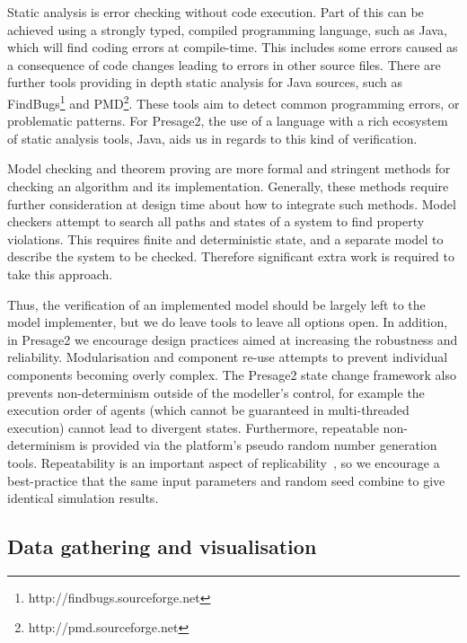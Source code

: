 Static analysis is error checking without code execution. Part of this can be
achieved using a strongly typed, compiled programming language, such as Java,
which will find coding errors at compile-time. This includes some errors
caused as a consequence of code changes leading to errors in other source
files. There are further tools providing in depth static analysis for Java
sources, such as FindBugs\footnote{http://findbugs.sourceforge.net} and
PMD\footnote{http://pmd.sourceforge.net}. These tools aim to detect common
programming errors, or problematic patterns. For Presage2, the use of a
language with a rich ecosystem of static analysis tools, Java, aids us in
regards to this kind of verification.

Model checking and theorem proving are more formal and stringent methods for
checking an algorithm and its implementation. Generally, these methods require
further consideration at design time about how to integrate such methods. Model
checkers attempt to search all paths and states of a system to find property
violations. This requires finite and deterministic state, and a separate model
to describe the system to be checked. Therefore significant extra work is
required to take this approach.

Thus, the verification of an implemented model should be largely left to the
model implementer, but we do leave tools to leave all options open. In
addition, in Presage2 we encourage design practices aimed at increasing the
robustness and reliability. Modularisation and component re-use attempts to
prevent individual components becoming overly complex. The Presage2 state
change framework also prevents non-determinism outside of the modeller's
control, for example the execution order of agents (which cannot be guaranteed
in multi-threaded execution) cannot lead to divergent states. Furthermore,
repeatable non- determinism is provided via the platform's pseudo random
number generation tools. Repeatability is an important aspect of
replicability~\citep{Axelrod1997,Ormerod2009}, so we encourage a best-practice
that the same input parameters and random seed combine to give identical
simulation results.


\subsection{Data gathering and visualisation}

